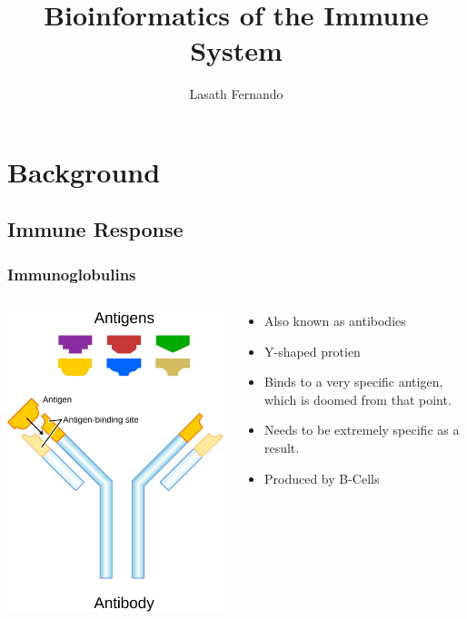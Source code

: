 \documentclass{beamer}
\begin{document}
\title{Bioinformatics of the Immune System}
\author{Lasath Fernando}

\begin{frame}
\titlepage
\end{frame}

\section{Background}
\subsection{Immune Response}
\begin{frame}
  \frametitle{Immunoglobulins}

  \begin{columns}
    \begin{column}{5cm}
    \includegraphics[width=\textwidth]{antibody.pdf}
    \end{column}
    \begin{column}{5cm}
    \begin{itemize}
     \item Also known as antibodies
     \item Y-shaped protien
     \item Binds to a very specific antigen, which is doomed from that point.
     \item Needs to be extremely specific as a result.
     \item Produced by B-Cells
    \end{itemize}


\end{column}
\end{columns}
\end{frame}
\end{document}
